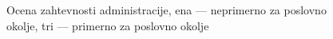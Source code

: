 \documentclass[a4paper, 12pt]{book}
\begin{document}
\begin{figure}[H]
\begin{center}

\end{center}
\caption{Ocena zahtevnosti administracije, ena --- neprimerno za poslovno okolje, tri --- primerno za poslovno okolje}

\label{administracija_funkcionalnost}
\end{figure}

\end{document}
